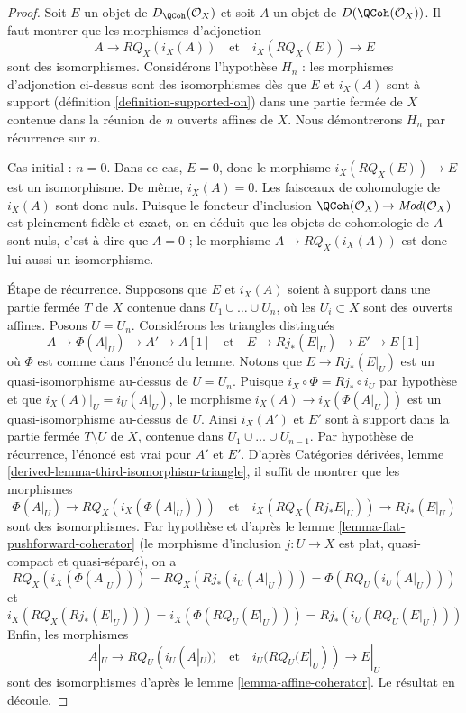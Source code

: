 \begin{proof}
Soit $E$ un objet de $D_\QCoh(\mathcal{O}_X)$ et
soit $A$ un objet de $D(\QCoh(\mathcal{O}_X))$.
Il faut montrer que les morphismes d'adjonction
$$
A \to RQ_X(i_X(A))
\quad\text{et}\quad
i_X(RQ_X(E)) \to E
$$
sont des isomorphismes. Considérons l'hypothèse
$H_n$ : les morphismes d'adjonction ci-dessus sont des isomorphismes
dès que $E$ et $i_X(A)$ sont à support
(définition \ref{definition-supported-on})
dans une partie fermée de $X$
contenue dans la réunion de $n$ ouverts affines de $X$.
Nous démontrerons $H_n$ par récurrence sur $n$.

\medskip\noindent
Cas initial : $n = 0$. Dans ce cas, $E = 0$, donc le morphisme
$i_X(RQ_X(E)) \to E$ est un isomorphisme. De même, $i_X(A) = 0$.
Les faisceaux de cohomologie de $i_X(A)$ sont donc nuls. Puisque le foncteur d'inclusion
$\QCoh(\mathcal{O}_X) \to \textit{Mod}(\mathcal{O}_X)$
est pleinement fidèle et exact, on en déduit que les objets de cohomologie
de $A$ sont nuls, c'est-à-dire que $A = 0$ ; le morphisme
$A \to RQ_X(i_X(A))$ est donc lui aussi un isomorphisme.

\medskip\noindent
Étape de récurrence. Supposons que $E$ et $i_X(A)$ soient à support dans une
partie fermée $T$ de $X$ contenue dans $U_1 \cup \ldots \cup U_n$,
où les $U_i \subset X$ sont des ouverts affines. Posons $U = U_n$.
Considérons les triangles distingués
$$
A \to \Phi(A|_U) \to A' \to A[1]
\quad\text{et}\quad
E \to Rj_*(E|_U) \to E' \to E[1]
$$
où $\Phi$ est comme dans l'énoncé du lemme.
Notons que $E \to Rj_*(E|_U)$ est un quasi-isomorphisme au-dessus de $U = U_n$.
Puisque $i_X \circ \Phi = Rj_* \circ i_U$ par hypothèse
et que $i_X(A)|_U = i_U(A|_U)$,
le morphisme $i_X(A) \to i_X(\Phi(A|_U))$ est un quasi-isomorphisme au-dessus de $U$.
Ainsi $i_X(A')$ et $E'$ sont à support dans la partie
fermée $T \setminus U$ de $X$, contenue dans
$U_1 \cup \ldots \cup U_{n - 1}$.
Par hypothèse de récurrence, l'énoncé est vrai pour $A'$ et $E'$. D'après
Catégories dérivées, lemme \ref{derived-lemma-third-isomorphism-triangle},
il suffit de montrer que les morphismes
$$
\Phi(A|_U) \to RQ_X(i_X(\Phi(A|_U)))
\quad\text{et}\quad
i_X(RQ_X(Rj_*E|_U)) \to Rj_*(E|_U)
$$
sont des isomorphismes. Par hypothèse et d'après
le lemme \ref{lemma-flat-pushforward-coherator}
(le morphisme d'inclusion $j : U \to X$ est plat, quasi-compact et
quasi-séparé), on a
$$
RQ_X(i_X(\Phi(A|_U))) = RQ_X(Rj_*(i_U(A|_U))) = \Phi(RQ_U(i_U(A|_U)))
$$
et
$$
i_X(RQ_X(Rj_*(E|_U))) = i_X(\Phi(RQ_U(E|_U))) = Rj_*(i_U(RQ_U(E|_U)))
$$
Enfin, les morphismes
$$
A|_U \to RQ_U(i_U(A|_U))
\quad\text{et}\quad
i_U(RQ_U(E|_U)) \to E|_U
$$
sont des isomorphismes d'après le lemme \ref{lemma-affine-coherator}. Le résultat en découle.
\end{proof}

